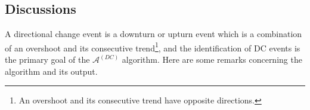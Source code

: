 \begin{algorithm}
\begin{algorithmic}
            \EndIf
            \EndIf
        \EndIf
    \EndFor
    \end{algorithmic}
\end{algorithm}

\subsection{Discussions}\label{subsec: dc discussion}
A directional change event is a downturn or upturn event which is a combination of an overshoot and its consecutive trend\footnote{An overshoot and its consecutive trend have opposite directions.}, and the identification of DC events is the primary goal of the $\mathcal{A}^{(DC)}$ algorithm. Here are some remarks concerning the algorithm and its output.

